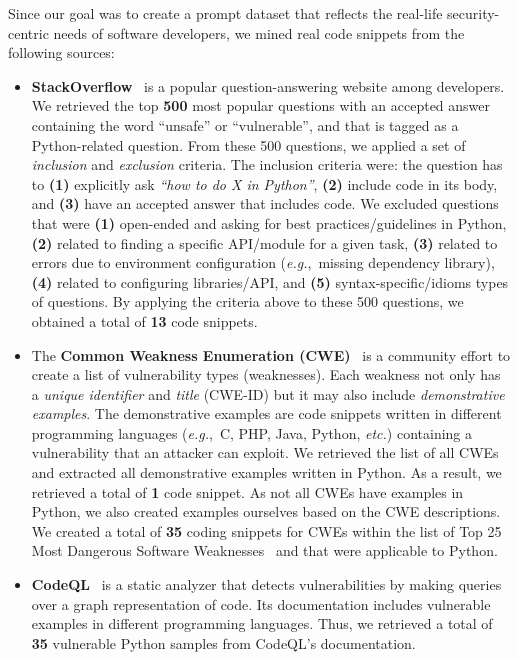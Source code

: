 \documentclass[pdflatex,sn-mathphys-ay]{sn-jnl}
\newcommand{\eg}{\textit{e.g.},\ }
\newcommand{\etc}{{\em etc.}}
\begin{document}
Since our goal was to create a prompt dataset that reflects the real-life security-centric needs of software developers, we mined real code snippets from the following sources:

\begin{itemize}[leftmargin=*, label=-,noitemsep,topsep=0pt]
\item \textbf{StackOverflow}~\cite{StackOverflowDevSurvey} is a popular question-answering website among developers. We retrieved the top \textbf{500} most popular questions with an accepted answer containing the word ``unsafe'' or ``vulnerable'', and that is tagged as a Python-related question. From these 500 questions, we applied a set of \textit{inclusion} and \textit{exclusion} criteria. The inclusion criteria were: the question has to \textbf{(1)} explicitly ask \textit{``how to do X in Python''}, \textbf{(2)} include code in its body, and \textbf{(3)} have an accepted answer that includes code. We excluded questions that were \textbf{(1)} open-ended and asking for best practices/guidelines in Python, \textbf{(2)} related to finding a specific API/module for a given task, \textbf{(3)} related to errors due to environment configuration (\eg missing dependency library), \textbf{(4)} related to configuring libraries/API, and \textbf{(5)} syntax-specific/idioms types of questions.
By applying the criteria above to these 500 questions, we obtained a total of \textbf{13} code snippets.

\item The \textbf{Common Weakness Enumeration (CWE)}~\cite{mitre} is a community effort to create a list of vulnerability types (weaknesses). Each weakness not only has a \textit{unique identifier} and \textit{title} (CWE-ID) but it may also include \textit{demonstrative examples}. The demonstrative examples are code snippets written in different programming languages (\eg C, PHP, Java, Python, \etc) containing a vulnerability that an attacker can exploit. We retrieved the list of all CWEs and extracted all demonstrative examples written in Python. As a result, we retrieved a total of \textbf{1} code snippet. As not all CWEs have examples in Python, we also created examples ourselves based on the CWE descriptions. We created a total of \textbf{35} coding snippets for CWEs within the list of Top 25 Most Dangerous Software Weaknesses~\cite{top25} and that were applicable to Python. 

\item \textbf{CodeQL}~\cite{codeql} is a static analyzer that detects vulnerabilities by making queries over a graph representation of code. Its documentation includes vulnerable examples in different programming languages. Thus, we retrieved a total of \textbf{35} vulnerable Python samples from CodeQL's documentation.


\end{itemize}
\end{document}
